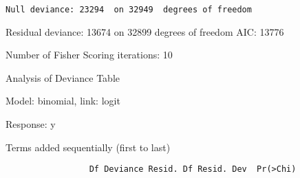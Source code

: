 \documentclass[english,man]{apa6}
\begin{document}
\begin{verbatim}
Null deviance: 23294  on 32949  degrees of freedom
\end{verbatim}

Residual deviance: 13674 on 32899 degrees of freedom AIC: 13776

Number of Fisher Scoring iterations: 10

Analysis of Deviance Table

Model: binomial, link: logit

Response: y

Terms added sequentially (first to last)

\begin{verbatim}
                 Df Deviance Resid. Df Resid. Dev  Pr(>Chi)    
\end{verbatim}
\end{document}

